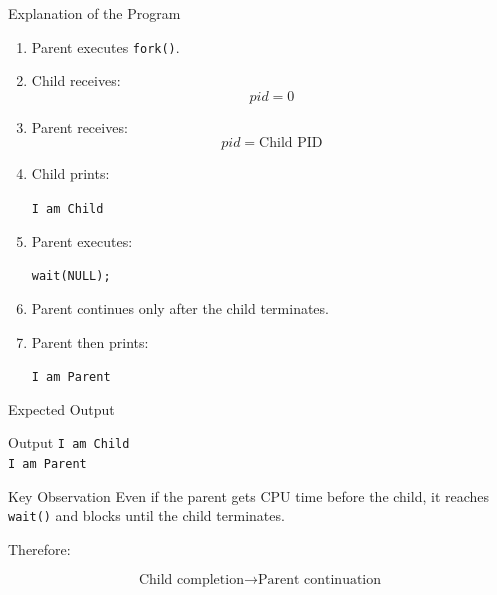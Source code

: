 \documentclass[aspectratio=169]{beamer}
\begin{document}
\begin{frame}{Explanation of the Program}

\begin{enumerate}

    \item Parent executes \texttt{fork()}.

    \item Child receives:
    \[
    pid = 0
    \]

    \item Parent receives:
    \[
    pid = \text{Child PID}
    \]

    \item Child prints:
    \begin{center}
    \texttt{I am Child}
    \end{center}

    \item Parent executes:
    \begin{center}
    \texttt{wait(NULL);}
    \end{center}

    \item Parent continues only after the child terminates.

    \item Parent then prints:
    \begin{center}
    \texttt{I am Parent}
    \end{center}

\end{enumerate}

\end{frame}

\begin{frame}{Expected Output}

\begin{block}{Output}
\texttt{I am Child}\\
\texttt{I am Parent}
\end{block}

\vspace{0.4cm}

\begin{alertblock}{Key Observation}
Even if the parent gets CPU time before the child, it reaches
\texttt{wait()} and blocks until the child terminates.
\end{alertblock}

\vspace{0.3cm}

Therefore:

\[
\boxed{
\text{Child completion}
\rightarrow
\text{Parent continuation}
}
\]

\end{frame}
\end{document}
